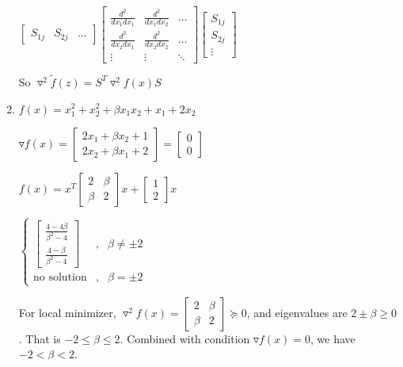 \documentclass[12pt]{article}
\begin{document}
\begin{enumerate}
$\begin{bmatrix} S_{1j} & S_{2j} & \hdots \end{bmatrix} \begin{bmatrix} \frac{d^2}{dx_1 dx_1} & \frac{d^2}{dx_1 dx_2} & \hdots\\ \frac{d^2}{dx_2 dx_1} & \frac{d^2}{dx_2 dx_2} & \hdots \\ \vdots  & \vdots & \ddots\end{bmatrix} \begin{bmatrix} S_{1j} \\ S_{2j} \\ \vdots \end{bmatrix} $



So $ \triangledown^2 \tilde f(z) = S^T \triangledown^2 f(x) S $







\bigskip
\item
$f(x) = x_1^2 + x_2^2 +\beta x_1 x_2 + x_1 + 2 x_2$

$\triangledown f(x) = \begin{bmatrix} 2x_1 + \beta x_2 + 1 \\ 2x_2 + \beta x_1 + 2 \end{bmatrix} = \begin{bmatrix} 0 \\ 0 \end{bmatrix}$

$f(x) = x^T \begin{bmatrix} 2 & \beta \\ \beta & 2 \end{bmatrix} x + \begin{bmatrix} 1 \\ 2 \end{bmatrix} x$

$\left\{ \begin{aligned}
\begin{bmatrix} \frac{4 - 4\beta}{\beta^2 - 4} \\ \frac{4 - \beta}{\beta^2 - 4} \end{bmatrix} &, & \beta \ne \pm 2 \\ \text{no solution}&, & \beta = \pm 2
\end{aligned} \right. $

For local minimizer,
$\triangledown^2 f(x) = \begin{bmatrix} 2 & \beta \\ \beta & 2 \end{bmatrix} \succeq 0$, and eigenvalues are $2 \pm \beta \ge 0$. That is $-2 \le \beta \le 2$. Combined with condition $\triangledown f(x) = 0$, we have $-2 < \beta < 2$.


\end{enumerate}
\end{document}
